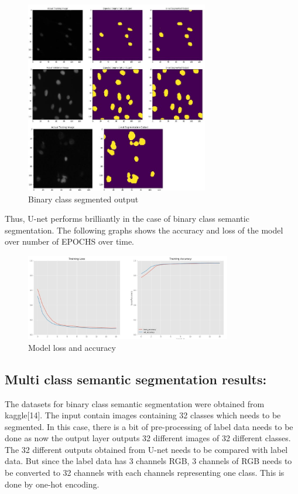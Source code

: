 \documentclass{IEEEtran}
\begin{document}
\begin{figure}[h]
    \centering
    \captionsetup{justification=centering}
    \includegraphics[width=8cm]{binaryclassoutput}
    \caption{Binary class segmented output}
    \label{fig:Binary class segmented output}
\end{figure}

Thus, U-net performs brilliantly in the case of binary class semantic segmentation. The following graphs shows the accuracy and loss of the model over number of EPOCHS over time.

\begin{figure}[h]
    \centering
    \captionsetup{justification=centering}
    \includegraphics[width=9cm]{accu1}
    \caption{Model loss and accuracy}
    \label{fig:}
\end{figure}

\subsection{\textbf{Multi class semantic segmentation results:}}
The datasets for binary class semantic segmentation were obtained from kaggle[14]. The input contain images containing 32 classes which needs to be segmented. In this case, there is a bit of pre-processing of label data needs to be done as now the output layer outputs 32 different images of 32 different classes. The 32 different outputs obtained from U-net needs to be compared with label data. But since the label data has 3 channels RGB,  3 channels of RGB needs to be converted to 32 channels with each channels representing one class. This is done by one-hot encoding. 
\end{document}
